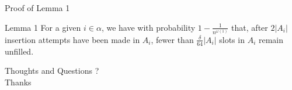 \documentclass{beamer}
\begin{document}
\begin{frame}{Proof of Lemma 1}
		\begin{block}{Lemma 1}
		For a given $i \in \alpha$, we have with probability $1 - \frac{1}{n^{\omega(1)}}$ that, after $2|A_i|$ insertion attempts have been made in $A_i$, fewer than $\frac{\delta}{64} |A_i|$ slots in $A_i$ remain unfilled.
	\end{block}

\end{frame}

\begin{frame}
\begin{center}
{\sc \LARGE Thoughts and Questions ?} \\
\vspace{3cm}
{\sc \large Thanks} 
\end{center}
\end{frame}




%
\end{document}
